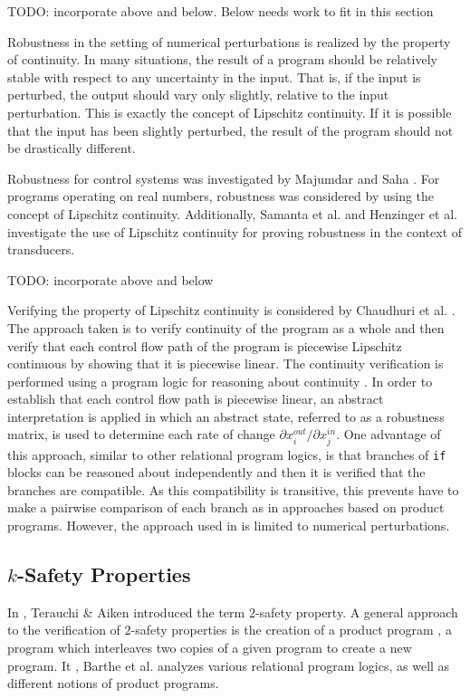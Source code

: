 \documentclass{llncs}
\begin{document}
    TODO: incorporate above and below. Below needs work to fit in this section

    Robustness in the setting of numerical perturbations is realized by the property
    of continuity.  In many situations, the result of a program should be relatively
    stable with respect to any uncertainty in the input.  That is, if the input is
    perturbed, the output should vary only slightly, relative to the input
    perturbation.  This is exactly the concept of Lipschitz continuity.  If it is
    possible that the input has been slightly perturbed, the result of the program
    should not be drastically different.  

    \space\space Robustness for control systems was
    investigated by Majumdar and Saha \cite{majumdar09}.  For programs operating on
    real numbers, robustness was considered by \cite{chaudhuri11} using the concept
    of Lipschitz continuity.  Additionally, Samanta et al. \cite{samanta13} and
    Henzinger et al. \cite{samanta14} investigate the use of Lipschitz continuity
    for proving robustness in the context of transducers.

    TODO: incorporate above and below

    Verifying the property of Lipschitz continuity is considered by Chaudhuri et al.
    \cite{chaudhuri10,chaudhuri11}.  The approach taken is to verify continuity of
    the program as a whole and then verify that each control flow path of the
    program is piecewise Lipschitz continuous by showing that it is piecewise
    linear.  The continuity verification is performed using a program logic for
    reasoning about continuity \cite{chaudhuri10}.  In order to establish that each
    control flow path is piecewise linear, an abstract interpretation is applied in
    which an abstract state, referred to as a robustness matrix, is used to
    determine each rate of change \(\partial x_{i}^{out}/\partial x_{j}^{in}\).  One
    advantage of this approach, similar to other relational program logics, is that
    branches of \verb!if! blocks can be reasoned about independently and then it is
    verified that the branches are compatible.  As this compatibility is transitive,
    this prevents have to make a pairwise comparison of each branch as in approaches
    based on product programs.  However, the approach used in
    \cite{chaudhuri10,chaudhuri11} is limited to numerical perturbations. 

  \subsection{$k$-Safety Properties}
    \space\space In \cite{terauchi05},
    Terauchi \& Aiken introduced the term \(2\)-safety property.  A general approach
    to the verification of \(2\)-safety properties is the creation of a product
    program \cite{bartheproduct}, a program which interleaves two copies of a given
    program to create a new program.  It \cite{bartheanalysis}, Barthe et al.
    analyzes various relational program logics, as well as different notions of
    product programs.
    \smallskip
\end{document}
